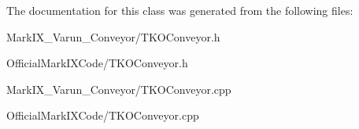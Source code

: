 The documentation for this class was generated from the following files\-:\begin{DoxyCompactItemize}
\item 
Mark\-I\-X\-\_\-\-Varun\-\_\-\-Conveyor/T\-K\-O\-Conveyor.\-h\item 
Official\-Mark\-I\-X\-Code/T\-K\-O\-Conveyor.\-h\item 
Mark\-I\-X\-\_\-\-Varun\-\_\-\-Conveyor/T\-K\-O\-Conveyor.\-cpp\item 
Official\-Mark\-I\-X\-Code/T\-K\-O\-Conveyor.\-cpp\end{DoxyCompactItemize}
